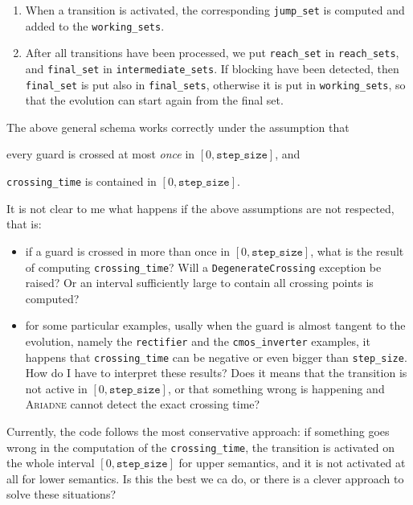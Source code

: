 \documentclass[english,a4paper]{article}
\newcommand{\ARIADNE}{\textsc{Ariadne}\xspace}
\theoremstyle{theorem}
\theoremstyle{definition}
\theoremstyle{remark}
\begin{document}
\begin{enumerate}
	\item When a transition is activated, the corresponding \texttt{jump\_set} is computed and added to the \texttt{working\_sets}.

	\item After all transitions have been processed, we put \texttt{reach\_set} in \texttt{reach\_sets}, and \texttt{final\_set} in \texttt{intermediate\_sets}. If blocking have been detected, then \texttt{final\_set} is put also in \texttt{final\_sets}, otherwise it is put in \texttt{working\_sets}, so that the evolution can start again from the final set.
\end{enumerate}

The above general schema works correctly under the assumption that
\begin{inparaenum}[\it (i)]
	\item every guard is crossed at most \emph{once} in $[0, \mathtt{step\_size}]$, and
	\item \texttt{crossing\_time} is contained in $[0, \mathtt{step\_size}]$.
\end{inparaenum}
%
It is not clear to me what happens if the above assumptions are not respected, that is:

\begin{itemize}
	\item if a guard is crossed in more than once in $[0, \mathtt{step\_size}]$, what is the result of computing \texttt{crossing\_time}? Will a \texttt{DegenerateCrossing} exception be raised? Or an interval sufficiently large to contain all crossing points is computed?

	\item for some particular examples, usally when the guard is almost tangent to the evolution, namely the \texttt{rectifier} and the \texttt{cmos\_inverter} examples, it happens that \texttt{crossing\_time} can be negative or even bigger than \texttt{step\_size}. How do I have to interpret these results? Does it means that the transition is not active in $[0, \mathtt{step\_size}]$, or that something wrong is happening and \ARIADNE cannot detect the exact crossing time?
\end{itemize}

\noindent Currently, the code follows the most conservative approach: if something goes wrong in the computation of the \texttt{crossing\_time}, the transition is activated on the whole interval $[0, \mathtt{step\_size}]$ for upper semantics, and it is not activated at all for lower semantics. Is this the best we ca do, or there is a clever approach to solve these situations?
\end{document}

